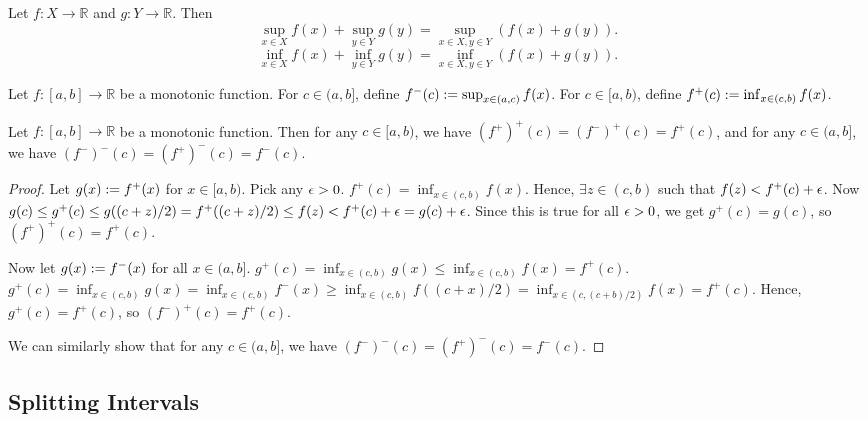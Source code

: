 \documentclass[a4paper,12pt,fleqn]{article}
\begin{document}
\begin{lemma}
\label{thm:sum-of-sup-inf-2}
Let $f: X \to \mathbb{R}$ and $g: Y \to \mathbb{R}$. Then
\[ \sup_{x \in X} f(x) + \sup_{y \in Y} g(y)
= \sup_{x \in X, y \in Y} (f(x) + g(y)). \]
\[ \inf_{x \in X} f(x) + \inf_{y \in Y} g(y)
= \inf_{x \in X, y \in Y} (f(x) + g(y)). \]
\end{lemma}

\begin{definition}
Let $f: [a, b] \to \mathbb{R}$ be a monotonic function.
For $c \in (a, b]$, define $f^-(c) := \sup_{x \in (a, c)} f(x)$.
For $c \in [a, b)$, define $f^+(c) := \inf_{x \in (c, b)} f(x)$.
\end{definition}

\begin{lemma}
\label{thm:eps-compose}
Let $f: [a, b] \to \mathbb{R}$ be a monotonic function.
Then for any $c \in [a, b)$, we have $(f^+)^+(c) = (f^-)^+(c) = f^+(c)$,
and for any $c \in (a, b]$, we have $(f^-)^-(c) = (f^+)^-(c) = f^-(c)$.
\end{lemma}
\begin{proof}
Let $g(x) := f^+(x)$ for $x \in [a, b)$. Pick any $\epsilon > 0$.
$f^+(c) = \inf_{x \in (c, b)} f(x)$.
Hence, $\exists z \in (c, b)$ such that $f(z) < f^+(c) + \epsilon$. Now
$g(c) \le g^+(c) \le g((c+z)/2) = f^+((c+z)/2) \le f(z) < f^+(c) + \epsilon = g(c) + \epsilon$.
Since this is true for all $\epsilon > 0$, we get $g^+(c) = g(c)$,
so $(f^+)^+(c) = f^+(c)$.

Now let $g(x) := f^-(x)$ for all $x \in (a, b]$.
$g^+(c) = \inf_{x \in (c, b)} g(x) \le \inf_{x \in (c, b)} f(x) = f^+(c)$.
$g^+(c) = \inf_{x \in (c, b)} g(x) = \inf_{x \in (c, b)} f^-(x) \ge \inf_{x \in (c, b)} f((c+x)/2)
= \inf_{x \in (c, (c+b)/2)} f(x) = f^+(c)$.
Hence, $g^+(c) = f^+(c)$, so $(f^-)^+(c) = f^+(c)$.

We can similarly show that for any $c \in (a, b]$, we have $(f^-)^-(c) = (f^+)^-(c) = f^-(c)$.
\end{proof}

\subsection{Splitting Intervals}
\end{document}
